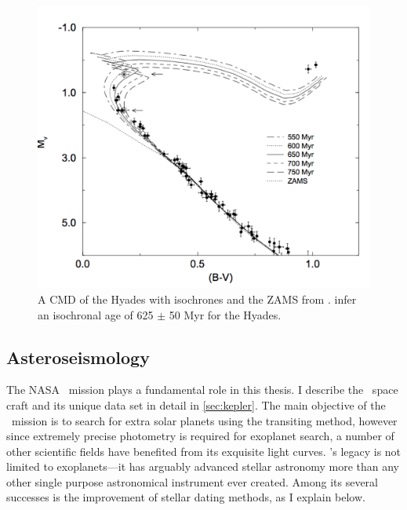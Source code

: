 \begin{figure}[p]
\begin{center}
\includegraphics[width=6in, clip=true]{figures/hyades.pdf}
\caption[A CMD of the Hyades.]
{A CMD of the Hyades with isochrones and the ZAMS from \citet{Perryman1998}.
\citet{Perryman1998} infer an isochronal age of 625 $\pm$ 50 Myr for the
Hyades.}
\label{fig:hyades}
\end{center}
\end{figure}


\subsection{Asteroseismology}
\label{sec:asteroseismology}

The NASA \kepler\ mission plays a fundamental role in this thesis.
I describe the \kepler\ space craft and its unique data set in detail in
\textsection \ref{sec:kepler}.
The main objective of the \kepler\ mission is to search for extra solar
planets using the transiting method, however since extremely precise
photometry is required for exoplanet search, a number of other scientific
fields have benefited from its exquisite light curves.
\kepler's legacy is not limited to exoplanets---it has arguably advanced
stellar astronomy more than any other single purpose astronomical instrument
ever created.
Among its several successes is the improvement of stellar dating methods, as
I explain below.

